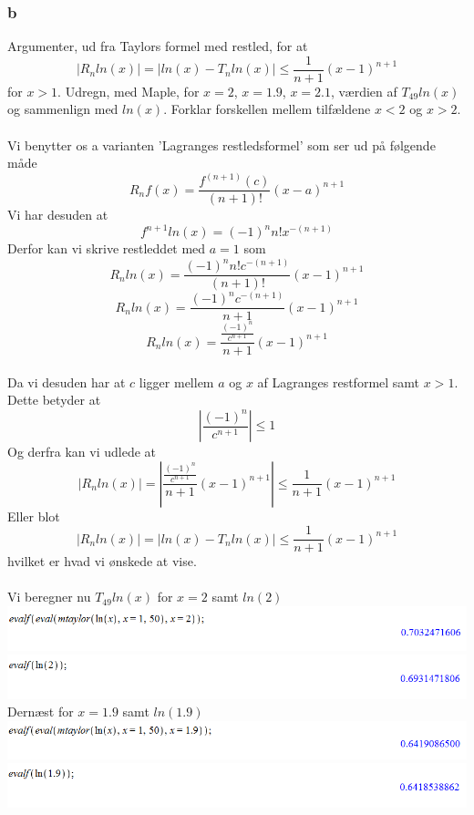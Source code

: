 \documentclass[12pt]{article}
\begin{document}
\subsubsection*{b}
Argumenter, ud fra Taylors formel med restled, for at
$$|R_nln(x)|=|ln(x)-T_nln(x)|\leq\frac{1}{n+1}(x-1)^{n+1}$$
for $x>1$. Udregn, med Maple, for $x=2$, $x=1.9$, $x=2.1$, værdien af $T_{49}ln(x)$ og sammenlign med $ln(x)$. Forklar forskellen mellem tilfældene $x<2$ og $x>2$.\\
\\
Vi benytter os a varianten 'Lagranges restledsformel' som ser ud på følgende måde$$R_nf(x)=\frac{f^{(n+1)}(c)}{(n+1)!}(x-a)^{n+1}$$
Vi har desuden at
$$f^{n+1}ln(x)=(-1)^nn!x^{-(n+1)}$$
Derfor kan vi skrive restleddet med $a=1$ som
$$R_nln(x)=\frac{(-1)^nn!c^{-(n+1)}}{(n+1)!}(x-1)^{n+1}$$
$$R_nln(x)=\frac{(-1)^nc^{-(n+1)}}{n+1}(x-1)^{n+1}$$
$$R_nln(x)=\frac{\frac{(-1)^n}{c^{n+1}}}{n+1}(x-1)^{n+1}$$
\\
Da vi desuden har at $c$ ligger mellem $a$ og $x$ af Lagranges restformel samt $x>1$. Dette betyder at
$$|\frac{(-1)^n}{c^{n+1}}|\leq1$$
Og derfra kan vi udlede at
$$|R_nln(x)|=|\frac{\frac{(-1)^n}{c^{n+1}}}{n+1}(x-1)^{n+1}|\leq\frac{1}{n+1}(x-1)^{n+1}$$
Eller blot
$$|R_nln(x)|=|ln(x)-T_nln(x)|\leq\frac{1}{n+1}(x-1)^{n+1}$$
hvilket er hvad vi ønskede at vise.\\
\\
Vi beregner nu $T_{49}ln(x)$ for $x=2$ samt $ln(2)$\\
\includegraphics[scale=0.6]{Pic5}\\
\includegraphics[scale=0.6]{Pic8}\\
Dernæst for $x=1.9$ samt $ln(1.9)$\\
\includegraphics[scale=0.6]{Pic6}\\
\includegraphics[scale=0.6]{Pic9}\\
\end{document}
